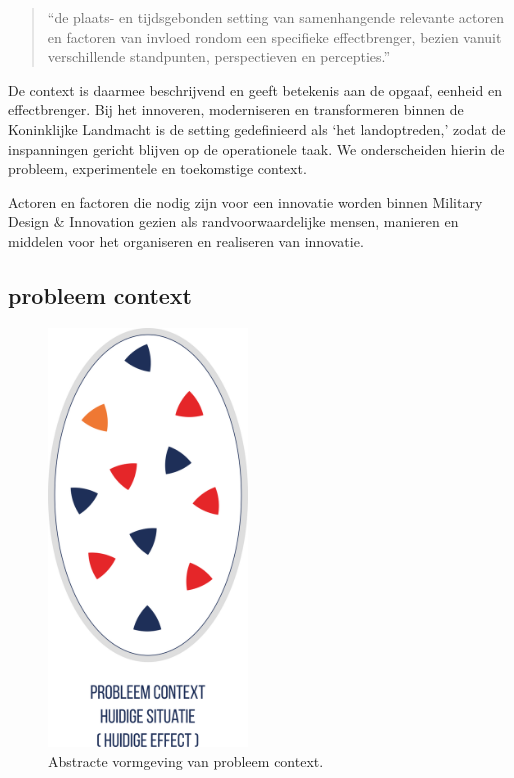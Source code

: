 \documentclass[
]{book}
\begin{document}
\begin{quote}
``de plaats- en tijdsgebonden setting van samenhangende relevante actoren en factoren van invloed rondom een specifieke effectbrenger, bezien vanuit verschillende standpunten, perspectieven en percepties.''
\end{quote}

De context is daarmee beschrijvend en geeft betekenis aan de opgaaf, eenheid en effectbrenger. Bij het innoveren, moderniseren en transformeren binnen de Koninklijke Landmacht is de setting gedefinieerd als `het landoptreden,' zodat de inspanningen gericht blijven op de operationele taak. We onderscheiden hierin de probleem, experimentele en toekomstige context.

Actoren en factoren die nodig zijn voor een innovatie worden binnen Military Design \& Innovation gezien als randvoorwaardelijke mensen, manieren en middelen voor het organiseren en realiseren van innovatie.

\hypertarget{probleem-context}{%
\subsection{probleem context}\label{probleem-context}}

\begin{figure}
\includegraphics[width=150pt]{data/images/20210324-MDI-eieren-beweging-1} \caption{Abstracte vormgeving van probleem context.}\label{fig:eieren-in-beweging-1}
\end{figure}
\end{document}
